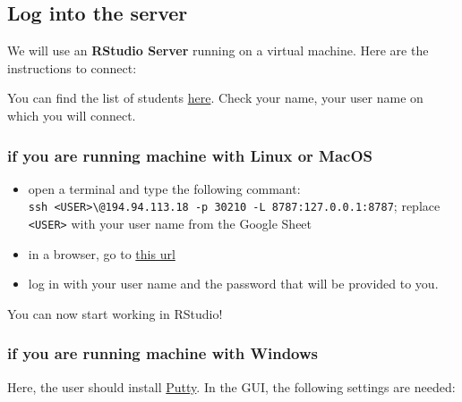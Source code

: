 \documentclass[
]{book}
\providecommand{\tightlist}{%
  \setlength{\itemsep}{0pt}\setlength{\parskip}{0pt}}
\begin{document}
\hypertarget{log-into-the-server}{%
\subsection*{Log into the server}\label{log-into-the-server}}

We will use an \textbf{RStudio Server} running on a virtual machine.
Here are the instructions to connect:

You can find the list of students \href{https://docs.google.com/spreadsheets/d/1eMCr4b6UcOPIG8tJkfoEkMoZzJycWJPMYN5nMZWiU48/edit?usp=sharing}{here}.
Check your name, your user name on which you will connect.

\hypertarget{if-you-are-running-machine-with-linux-or-macos}{%
\subsubsection*{if you are running machine with Linux or MacOS}\label{if-you-are-running-machine-with-linux-or-macos}}

\begin{itemize}
\tightlist
\item
  open a terminal and type the following commant: \texttt{ssh\ \textless{}USER\textgreater{}\textbackslash{}@194.94.113.18\ -p\ 30210\ -L\ 8787:127.0.0.1:8787}; replace \texttt{\textless{}USER\textgreater{}} with your user name from the Google Sheet
\item
  in a browser, go to \href{http://127.0.0.1:8787}{this url}
\item
  log in with your user name and the password that will be provided to you.
\end{itemize}

You can now start working in RStudio!

\hypertarget{if-you-are-running-machine-with-windows}{%
\subsubsection*{if you are running machine with Windows}\label{if-you-are-running-machine-with-windows}}

Here, the user should install \href{https://www.putty.org/}{Putty}.
In the GUI, the following settings are needed:
\end{document}
